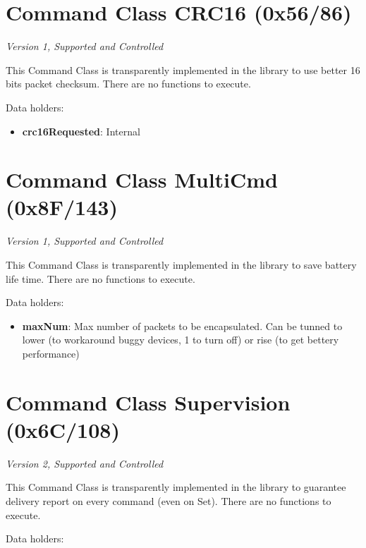 \section{Command Class CRC16 (0x56/86)}

\textit{Version 1, Supported and Controlled}
\newline

This Command Class is transparently implemented in the library to use better 16 bits packet checksum. There are no functions to execute.
\newline

\noindent
Data holders:

\begin{itemize}
\item \textbf{crc16Requested}: Internal
\end{itemize}


\section{Command Class MultiCmd (0x8F/143)}

\textit{Version 1, Supported and Controlled}
\newline

This Command Class is transparently implemented in the library to save battery life time. There are no functions to execute.
\newline

\noindent
Data holders:

\begin{itemize}
\item \textbf{maxNum}: Max number of packets to be encapsulated. Can be tunned to lower (to workaround buggy devices, 1 to turn off) or rise (to get bettery performance)
\end{itemize}


\section{Command Class Supervision (0x6C/108)}

\textit{Version 2, Supported and Controlled}
\newline

This Command Class is transparently implemented in the library to guarantee delivery report on every command (even on Set). There are no functions to execute.
\newline

\noindent
Data holders:

